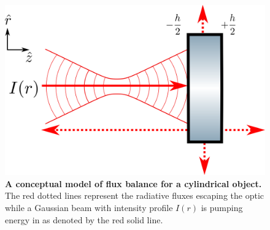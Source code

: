 \begin{figure}[ht]
	\centering
	\includegraphics[width=.6 \textwidth]{../Figures/ThermalLensFlux.png}
	\caption[A conceptual model of flux balance for a cylindrical object.]  
	{\textbf{A conceptual model of flux balance for a cylindrical object.} The red dotted lines represent the radiative fluxes escaping the optic while a Gaussian beam with intensity profile $I(r)$ is pumping energy in as denoted by the red solid line.}
	\label{fig:ThermalLensFlux}
\end{figure}


